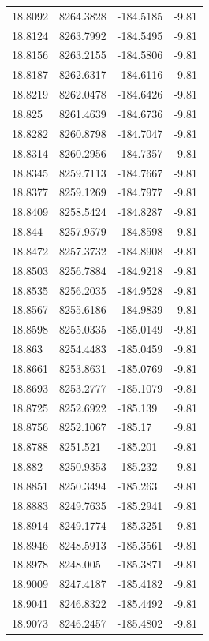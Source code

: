 \begin{table}[H]
\begin{tabular}{llll}
18.8092 & 8264.3828 & -184.5185 & -9.81 \\
18.8124 & 8263.7992 & -184.5495 & -9.81 \\
18.8156 & 8263.2155 & -184.5806 & -9.81 \\
18.8187 & 8262.6317 & -184.6116 & -9.81 \\
18.8219 & 8262.0478 & -184.6426 & -9.81 \\
18.825 & 8261.4639 & -184.6736 & -9.81 \\
18.8282 & 8260.8798 & -184.7047 & -9.81 \\
18.8314 & 8260.2956 & -184.7357 & -9.81 \\
18.8345 & 8259.7113 & -184.7667 & -9.81 \\
18.8377 & 8259.1269 & -184.7977 & -9.81 \\
18.8409 & 8258.5424 & -184.8287 & -9.81 \\
18.844 & 8257.9579 & -184.8598 & -9.81 \\
18.8472 & 8257.3732 & -184.8908 & -9.81 \\
18.8503 & 8256.7884 & -184.9218 & -9.81 \\
18.8535 & 8256.2035 & -184.9528 & -9.81 \\
18.8567 & 8255.6186 & -184.9839 & -9.81 \\
18.8598 & 8255.0335 & -185.0149 & -9.81 \\
18.863 & 8254.4483 & -185.0459 & -9.81 \\
18.8661 & 8253.8631 & -185.0769 & -9.81 \\
18.8693 & 8253.2777 & -185.1079 & -9.81 \\
18.8725 & 8252.6922 & -185.139 & -9.81 \\
18.8756 & 8252.1067 & -185.17 & -9.81 \\
18.8788 & 8251.521 & -185.201 & -9.81 \\
18.882 & 8250.9353 & -185.232 & -9.81 \\
18.8851 & 8250.3494 & -185.263 & -9.81 \\
18.8883 & 8249.7635 & -185.2941 & -9.81 \\
18.8914 & 8249.1774 & -185.3251 & -9.81 \\
18.8946 & 8248.5913 & -185.3561 & -9.81 \\
18.8978 & 8248.005 & -185.3871 & -9.81 \\
18.9009 & 8247.4187 & -185.4182 & -9.81 \\
18.9041 & 8246.8322 & -185.4492 & -9.81 \\
18.9073 & 8246.2457 & -185.4802 & -9.81 \\

\end{tabular}
\end{table}
